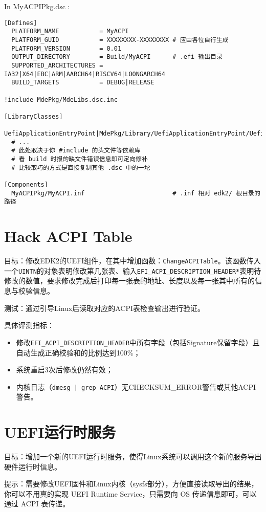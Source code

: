 In MyACPIPkg.dsc :

\begin{lstlisting}
[Defines]
  PLATFORM_NAME           = MyACPI
  PLATFORM_GUID           = XXXXXXXX-XXXXXXXX # 应由各位自行生成
  PLATFORM_VERSION        = 0.01
  OUTPUT_DIRECTORY        = Build/MyACPI      # .efi 输出目录
  SUPPORTED_ARCHITECTURES = IA32|X64|EBC|ARM|AARCH64|RISCV64|LOONGARCH64
  BUILD_TARGETS           = DEBUG|RELEASE

!include MdePkg/MdeLibs.dsc.inc

[LibraryClasses]
  UefiApplicationEntryPoint|MdePkg/Library/UefiApplicationEntryPoint/UefiApplicationEntryPoint.inf
  # ...
  # 此处取决于你 #include 的头文件等依赖库
  # 看 build 时报的缺文件错误信息即可定向修补
  # 比较取巧的方式是直接复制其他 .dsc 中的一坨

[Components]
  MyACPIPkg/MyACPI.inf                        # .inf 相对 edk2/ 根目录的路径
\end{lstlisting}

\section{Hack ACPI Table}
目标：修改EDK2的UEFI组件，在其中增加函数：\texttt{ChangeACPITable}。该函数传入一个\texttt{UINTN}的对象表明修改第几张表、输入\texttt{EFI\_ACPI\_DESCRIPTION\_HEADER*}表明待修改的数值，要求修改完成后打印每一张表的地址、长度以及每一张其中所有的信息与校验信息。

测试：通过引导Linux后读取对应的ACPI表检查输出进行验证。

具体评测指标：
\begin{itemize}
\item 修改\texttt{EFI\_ACPI\_DESCRIPTION\_HEADER}中所有字段（包括Signature保留字段）且自动生成正确校验和的比例达到100\%；
\item 系统重启3次后修改仍然有效；
\item 内核日志（\texttt{dmesg | grep ACPI}）无CHECKSUM\_ERROR警告或其他ACPI警告。
\end{itemize}

\section{UEFI运行时服务}
目标：增加一个新的UEFI运行时服务，使得Linux系统可以调用这个新的服务导出硬件运行时信息。

提示：需要修改UEFI固件和Linux内核（sysfs部分），方便直接读取导出的结果， 
你可以不用真的实现 UEFI Runtime Service，只需要向 OS 传递信息即可，可以通过 ACPI 表传递。

